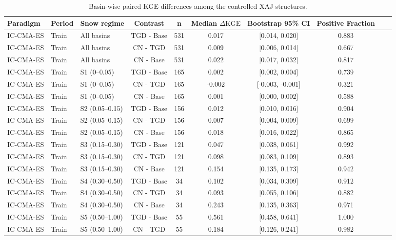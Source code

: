 \begin{table}[t]
\centering
\caption{Basin-wise paired KGE differences among the controlled XAJ structures.}
\label{tab:s2_paired_structural_kge_differences}
\begin{threeparttable}
\begin{tabular}{lllccccccc}
\toprule
Paradigm & Period & Snow regime & Contrast & n & Median $\Delta\text{KGE}$ & Bootstrap 95\% CI & Positive Fraction \\
\midrule
IC-CMA-ES & Train & All basins & TGD - Base & 531 & 0.017 & [0.014, 0.020] & 0.883 \\
IC-CMA-ES & Train & All basins & CN - TGD & 531 & 0.009 & [0.006, 0.014] & 0.667 \\
IC-CMA-ES & Train & All basins & CN - Base & 531 & 0.022 & [0.017, 0.032] & 0.817 \\
IC-CMA-ES & Train & S1 (0–0.05) & TGD - Base & 165 & 0.002 & [0.002, 0.004] & 0.739 \\
IC-CMA-ES & Train & S1 (0–0.05) & CN - TGD & 165 & -0.002 & [-0.003, -0.001] & 0.321 \\
IC-CMA-ES & Train & S1 (0–0.05) & CN - Base & 165 & 0.001 & [0.000, 0.002] & 0.588 \\
IC-CMA-ES & Train & S2 (0.05–0.15) & TGD - Base & 156 & 0.012 & [0.010, 0.016] & 0.904 \\
IC-CMA-ES & Train & S2 (0.05–0.15) & CN - TGD & 156 & 0.007 & [0.004, 0.009] & 0.699 \\
IC-CMA-ES & Train & S2 (0.05–0.15) & CN - Base & 156 & 0.018 & [0.016, 0.022] & 0.865 \\
IC-CMA-ES & Train & S3 (0.15–0.30) & TGD - Base & 121 & 0.047 & [0.038, 0.061] & 0.992 \\
IC-CMA-ES & Train & S3 (0.15–0.30) & CN - TGD & 121 & 0.098 & [0.083, 0.109] & 0.893 \\
IC-CMA-ES & Train & S3 (0.15–0.30) & CN - Base & 121 & 0.154 & [0.135, 0.173] & 0.942 \\
IC-CMA-ES & Train & S4 (0.30–0.50) & TGD - Base & 34 & 0.102 & [0.034, 0.309] & 0.912 \\
IC-CMA-ES & Train & S4 (0.30–0.50) & CN - TGD & 34 & 0.093 & [0.055, 0.106] & 0.882 \\
IC-CMA-ES & Train & S4 (0.30–0.50) & CN - Base & 34 & 0.243 & [0.135, 0.363] & 0.971 \\
IC-CMA-ES & Train & S5 (0.50–1.00) & TGD - Base & 55 & 0.561 & [0.458, 0.641] & 1.000 \\
IC-CMA-ES & Train & S5 (0.50–1.00) & CN - TGD & 55 & 0.184 & [0.126, 0.241] & 0.982 \\

\end{tabular}
\end{threeparttable}
\end{table}
